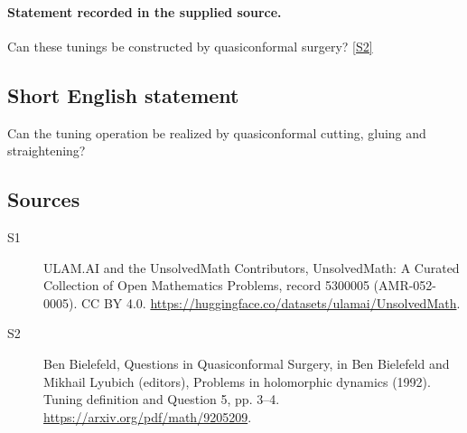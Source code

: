 \documentclass[11pt]{article}
\newcommand{\sref}[2]{\hyperlink{source:#1:#2}{[S#2]}}
\begin{document}
\paragraph{Statement recorded in the supplied source.}
Can these tunings be constructed by quasiconformal surgery? \sref{5300005}{2}
\subsection{Short English statement}
Can the tuning operation be realized by quasiconformal cutting, gluing and straightening?
\subsection{Sources}
\begin{description}
\item[\hypertarget{source:5300005:1}{S1}] ULAM.AI and the UnsolvedMath Contributors, UnsolvedMath: A Curated Collection of Open Mathematics Problems, record 5300005 (AMR-052-0005). CC BY 4.0. \url{https://huggingface.co/datasets/ulamai/UnsolvedMath}.
\item[\hypertarget{source:5300005:2}{S2}] Ben Bielefeld, Questions in Quasiconformal Surgery, in Ben Bielefeld and Mikhail Lyubich (editors), Problems in holomorphic dynamics (1992). Tuning definition and Question 5, pp. 3–4. \url{https://arxiv.org/pdf/math/9205209}.
\end{description}
\label{end:5300005}
\end{document}
